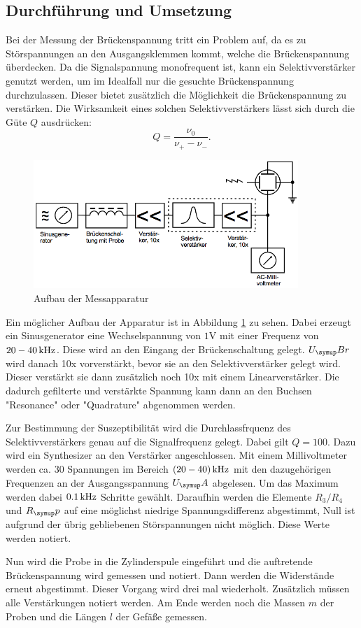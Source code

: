 \subsection{Durchführung und Umsetzung}
Bei der Messung der Brückenspannung tritt ein Problem auf, da es zu Störspannungen
an den Ausgangsklemmen kommt, welche die Brückenspannung überdecken. Da die
Signalspannung monofrequent ist, kann ein Selektivverstärker genutzt werden,
um im Idealfall nur die gesuchte Brückenspannung durchzulassen. Dieser bietet
zusätzlich die Möglichkeit die Brückenspannung zu verstärken. Die Wirksamkeit
eines solchen Selektivverstärkers lässt sich durch die Güte $Q$ ausdrücken:
\begin{equation}
  Q = \frac{\nu_0}{\nu_+ - \nu_-}.
\end{equation}
\begin{figure}
  \centering
  \includegraphics[width=10cm]{bilder/aufbau.png}
  \caption{Aufbau der Messapparatur \cite{606}}
  \label{fig:aufbau}
\end{figure}
Ein möglicher Aufbau der Apparatur ist in Abbildung \ref{fig:aufbau} zu sehen.
Dabei erzeugt ein Sinusgenerator eine Wechselspannung von $1 \si{\volt}$ mit
einer Frequenz von $20-40 \,\si{\kilo\hertz}$. Diese wird an den Eingang der Brückenschaltung
gelegt. $U_\su{Br}$ wird danach 10x vorverstärkt, bevor sie an den Selektivverstärker
gelegt wird. Dieser verstärkt sie dann zusätzlich noch 10x mit einem Linearverstärker.
Die dadurch gefilterte und verstärkte Spannung kann dann an den Buchsen "Resonance"
oder "Quadrature" abgenommen werden.

Zur Bestimmung der Suszeptibilität wird die Durchlassfrquenz des Selektivverstärkers
genau auf die Signalfrequenz gelegt. Dabei gilt $Q = 100$. Dazu wird ein Synthesizer
an den Verstärker angeschlossen. Mit einem Millivoltmeter werden ca. 30 Spannungen
im Bereich $(20-40) \,\si{\kilo\hertz}$ mit den dazugehörigen Frequenzen an der Ausgangsspannung
$U_\su{A}$ abgelesen. Um das Maximum werden dabei $0.1 \,\si{\kilo\hertz}$ Schritte gewählt.
Daraufhin werden die Elemente $R_3 / R_4$ und $R_\su{p}$ auf eine möglichst niedrige
Spannungsdifferenz abgestimmt, Null ist aufgrund der übrig gebliebenen Störspannungen
nicht möglich. Diese Werte werden notiert.

Nun wird die Probe in die Zylinderspule eingeführt und die auftretende Brückenspannung
wird gemessen und notiert. Dann werden die Widerstände erneut abgestimmt.
Dieser Vorgang wird drei mal wiederholt. Zusätzlich müssen alle Verstärkungen
notiert werden. Am Ende werden noch die Massen $m$ der Proben und die Längen $l$ der
Gefäße gemessen.
